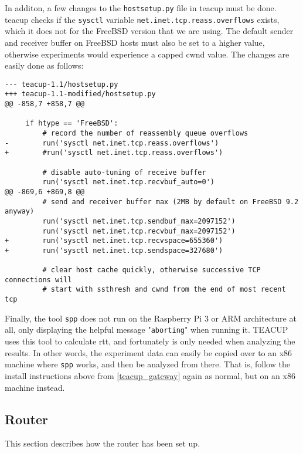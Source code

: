 In additon, a few changes to the \lstinline{hostsetup.py} file in \gls{teacup} must be done. \gls{teacup} checks if the \lstinline{sysctl} variable \lstinline{net.inet.tcp.reass.overflows} exists, which it does not for the FreeBSD version that we are using. The default sender and receiver buffer on FreeBSD hosts must also be set to a higher value, otherwise experiments would experience a capped \gls{cwnd} value. The changes are easily done as follows:

\begin{verbatim}
--- teacup-1.1/hostsetup.py
+++ teacup-1.1-modified/hostsetup.py
@@ -858,7 +858,7 @@
 
     if htype == 'FreeBSD':
         # record the number of reassembly queue overflows
-        run('sysctl net.inet.tcp.reass.overflows')
+        #run('sysctl net.inet.tcp.reass.overflows')
 
         # disable auto-tuning of receive buffer
         run('sysctl net.inet.tcp.recvbuf_auto=0')
@@ -869,6 +869,8 @@
         # send and receiver buffer max (2MB by default on FreeBSD 9.2 anyway)
         run('sysctl net.inet.tcp.sendbuf_max=2097152')
         run('sysctl net.inet.tcp.recvbuf_max=2097152')
+        run('sysctl net.inet.tcp.recvspace=655360')
+        run('sysctl net.inet.tcp.sendspace=327680')
 
         # clear host cache quickly, otherwise successive TCP connections will
         # start with ssthresh and cwnd from the end of most recent tcp
\end{verbatim}

Finally, the tool \lstinline{spp} does not run on the Raspberry Pi 3 or ARM architecture at all, only displaying the helpful message "\lstinline{aborting}" when running it. TEACUP uses this tool to calculate \gls{rtt}, and fortunately is only needed when analyzing the results. In other words, the experiment data can easily be copied over to an x86 machine where \lstinline{spp} works, and then be analyzed from there. That is, follow the install instructions above from \ref{teacup_gateway} again as normal, but on an x86 machine instead.






\subsection{Router}

This section describes how the router has been set up. 

